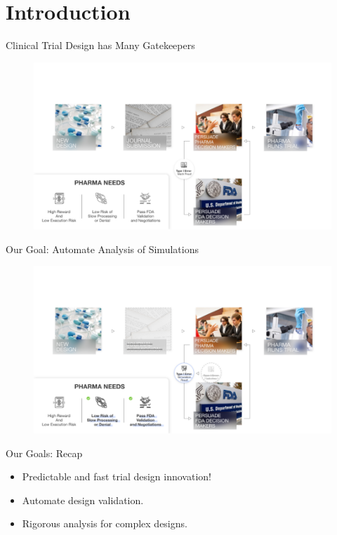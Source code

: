 \section{Introduction}%
\frame{\tableofcontents[currentsection]}

\begin{frame}{Clinical Trial Design has Many Gatekeepers}
\begin{figure}
    \centering
    \includegraphics[width=\linewidth]{figs/motivation-3.png}
\end{figure}
\end{frame}

\begin{frame}{Our Goal: Automate Analysis of Simulations}
\begin{figure}
    \centering
    \includegraphics[width=\linewidth]{figs/motivation-4.png}
\end{figure}
\end{frame}

\begin{frame}{Our Goals: Recap}
\begin{itemize}
    \item Predictable and fast trial design innovation!
    \item Automate design validation.
    \item Rigorous analysis for complex designs.
\end{itemize} 
\end{frame}

